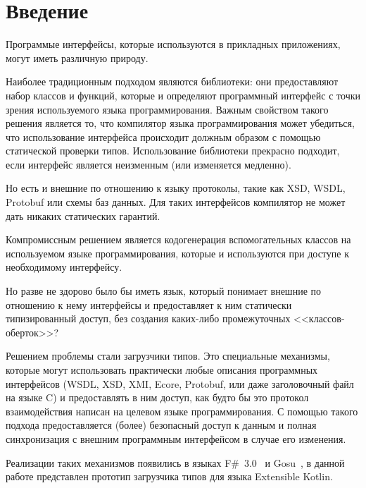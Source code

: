 \section{Введение}

Программые интерфейсы, которые используются в прикладных приложениях, могут иметь различную природу. 

Наиболее традиционным подходом являются библиотеки: они предоставляют набор классов и функций, которые и определяют программный интерфейс с точки зрения используемого языка программирования.
Важным свойством такого решения является то, что компилятор языка программирования может убедиться, что использование интерфейса происходит должным образом с помощью статической проверки типов. Использование библиотеки прекрасно подходит, если интерфейс является неизменным (или изменяется медленно).

Но есть и внешние по отношению к языку протоколы, такие как XSD, WSDL, Protobuf или схемы баз данных. Для таких интерфейсов компилятор не может дать никаких статических гарантий.

Компромиссным решением является кодогенерация вспомогательных классов на используемом языке программирования, которые и используются при доступе к необходимому интерфейсу.

Но разве не здорово было бы иметь язык, который понимает внешние по отношению к нему интерфейсы и предоставляет к ним статически типизированный доступ, без создания каких-либо промежуточных <<классов-оберток>>?

Решением проблемы стали загрузчики типов. Это специальные механизмы, которые могут использовать практически любые описания программных интерфейсов (WSDL, XSD, XMI, Ecore, Protobuf, или даже заголовочный файл на языке C) и предоставлять в ним доступ, как будто бы это протокол взаимодействия написан на целевом \td языке программирования.
С помощью такого подхода предоставляется (\td более) безопасный доступ к данным и полная синхронизация с внешним программным интерфейсом в случае его изменения.

Реализации таких механизмов появились в языках F\#~3.0~\cite{joepamer2011} и Gosu~\cite{gosuguide}, в данной работе представлен прототип загрузчика типов для языка Extensible Kotlin.

\clearpage